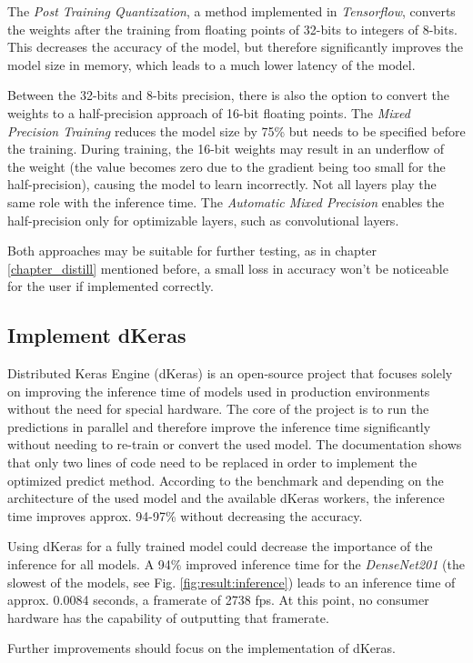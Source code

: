 The \textit{Post Training Quantization}\cite{postprec}, a method implemented in \textit{Tensorflow}, converts the weights after the training from floating points of 32-bits to integers of 8-bits. This decreases the accuracy of the model, but therefore significantly improves the model size in memory, which leads to a much lower latency of the model.

Between the 32-bits and 8-bits precision, there is also the option to convert the weights to a half-precision approach of 16-bit floating points. The \textit{Mixed Precision Training} reduces the model size by 75\% but needs to be specified before the training. During training, the 16-bit weights may result in an underflow of the weight (the value becomes zero due to the gradient being too small for the half-precision), causing the model to learn incorrectly. Not all layers play the same role with the inference time. The \textit{Automatic Mixed Precision} enables the half-precision only for optimizable layers, such as convolutional layers.\cite{micikevicius2018mixed}

Both approaches may be suitable for further testing, as in chapter \ref{chapter_distill} mentioned before, a small loss in accuracy won't be noticeable for the user if implemented correctly.

\subsection{Implement dKeras}
Distributed Keras Engine (dKeras)\cite{dkeras} is an open-source project that focuses solely on improving the inference time of models used in production environments without the need for special hardware. The core of the project is to run the predictions in parallel and therefore improve the inference time significantly without needing to re-train or convert the used model. The documentation shows that only two lines of code need to be replaced in order to implement the optimized predict method. According to the benchmark and depending on the architecture of the used model and the available dKeras workers, the inference time improves approx. 94-97\% without decreasing the accuracy. 

Using dKeras for a fully trained model could decrease the importance of the inference for all models. A 94\% improved inference time for the \textit{DenseNet201} (the slowest of the models, see Fig. \ref{fig:result:inference}) leads to an inference time of approx. 0.0084 seconds, a framerate of 2738 fps. At this point, no consumer hardware has the capability of outputting that framerate.

Further improvements should focus on the implementation of dKeras.